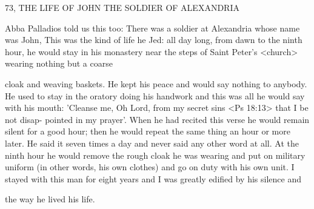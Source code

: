 73, THE LIFE OF JOHN THE SOLDIER
OF ALEXANDRIA

Abba Palladios told us this too: There was a soldier at Alexandria
whose name was John, This was the kind of life he Jed: all day long,
from dawn to the ninth hour, he would stay in his monastery near
the steps of Saint Peter's <church> wearing nothing but a coarse

cloak and weaving baskets. He kept his peace and would say
nothing to anybody. He used to stay in the oratory doing his
handwork and this was all he would say with his mouth: 'Cleanse
me, Oh Lord, from my secret sins <Ps 18:13> that I be not disap-
pointed in my prayer'. When he had recited this verse he would
remain silent for a good hour; then he would repeat the same thing
an hour or more later. He said it seven times a day and never said
any other word at all. At the ninth hour he would remove the rough
cloak he was wearing and put on military uniform (in other words,
his own clothes) and go on duty with his own unit. I stayed with
this man for eight years and I was greatly edified by his silence and

the way he lived his life.

